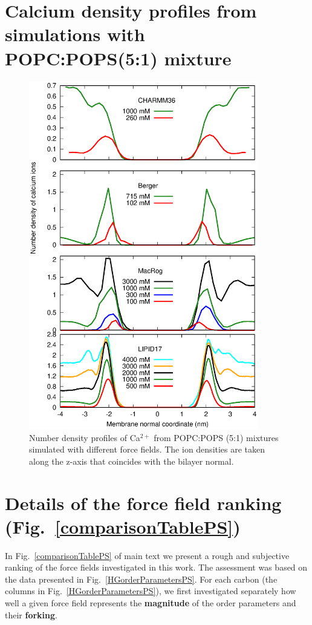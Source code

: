 \documentclass[journal=jpcbfk,manuscript=article]{achemso}
\newcommand{\todo}[1]{\textcolor{red}{#1}}
\begin{document}
\section{Calcium density profiles from simulations with \\ POPC:POPS(5:1) mixture}
\begin{figure}[ht]
  \centering
  \includegraphics[width=10cm]{../Figs/CAdensPCPSmixture.eps}
  \caption{\label{CAdensPCPSmixtureALL}
    Number density profiles of Ca$^{2+}$ from POPC:POPS (5:1) mixtures simulated with different force fields. The ion densities are taken along the z-axis that coincides with the bilayer normal. 
  }
\end{figure}

\clearpage

\section{Details of the force field ranking (Fig.~\ref{comparisonTablePS})}\label{Ranking} 
In Fig.~\ref{comparisonTablePS} of main text we present a rough and subjective ranking of the force fields investigated in this work. 
The assessment was based on the data presented in Fig.~\ref{HGorderParametersPS}.
%
For each carbon (the columns in Fig.~\ref{HGorderParametersPS}),
we first investigated separately how well a given force field represents the {\bf magnitude} of the order parameters and their {\bf forking}.
\end{document}
